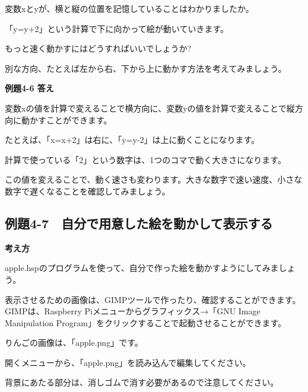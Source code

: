 \documentclass[a4paper,12pt]{jarticle}
\begin{document}
\bigskip
\bigskip
\bigskip

変数xとyが、横と縦の位置を記憶していることはわかりましたか。

「y=y+2」という計算で下に向かって絵が動いていきます。

もっと速く動かすにはどうすればいいでしょうか?

別な方向、たとえば左から右、下から上に動かす方法を考えてみましょう。


\bigskip


\bigskip


\bigskip

{\bfseries
例題4-6 答え}


\bigskip

変数xの値を計算で変えることで横方向に、変数yの値を計算で変えることで縦方向に動かすことができます。

たとえば、「x=x+2」は右に、「y=y-2」は上に動くことになります。

計算で使っている「2」という数字は、1つのコマで動く大きさになります。

この値を変えることで、動く速さも変わります。大きな数字で速い速度、小さな数字で遅くなることを確認してみましょう。

\clearpage
\subsection{例題4-7　自分で用意した絵を動かして表示する}
\bigskip
\bigskip

{\bfseries
考え方}

\bigskip

apple.hspのプログラムを使って、自分で作った絵を動かすようにしてみましょう。

表示させるための画像は、GIMPツールで作ったり、確認することができます。GIMPは、Raspberry
Piメニューからグラフィックス→「GNU Image
Manipulation
Program」をクリックすることで起動させることができます。

りんごの画像は、「apple.png」です。

開くメニューから、「apple.png」を読み込んで編集してください。

背景にあたる部分は、消しゴムで消す必要があるので注意してください。

\bigskip
\bigskip
\end{document}
